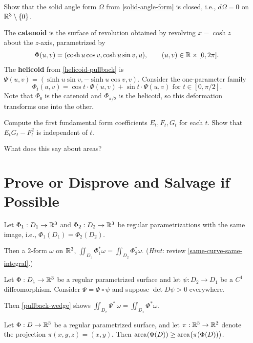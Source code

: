 \documentclass{homework}
\begin{document}
\begin{problem}\label{solid-angle-closed}%
  Show that the solid angle form $\Omega$ from \ref{solid-angle-form} is closed, i.e., $d\Omega=0$ on $\mathbb{R}^3\setminus\{0\}$.
  \end{problem}

\begin{problem}
  The \textbf{catenoid} is the surface of revolution obtained by revolving $x=\cosh z$ about the $z$-axis, parametrized by
  \[
    \Phi(u,v)=(\cosh u\cos v,\cosh u\sin v,u), \qquad (u,v)\in\mathbb{R}\times[0,2\pi].
  \]
  The \textbf{helicoid} from \ref{helicoid-pullback} is $\Psi(u,v)=(\sinh u \sin v,-\sinh u \cos v,v)$.
  Consider the one-parameter family
  \[
    \Phi_t(u,v)=\cos t \cdot \Phi(u,v) + \sin t \cdot \Psi(u,v)
    \text{ for $t\in[0,\pi/2]$.}
  \]
  Note that $\Phi_0$ is the catenoid and $\Phi_{\pi/2}$ is the helicoid, so this deformation transforms one into the other.

  Compute the first fundamental form coefficients $E_t,F_t,G_t$ for each $t$. Show that $E_t G_t - F_t^2$ is independent of $t$.
  
  What does this say about areas?
\end{problem}


\section{Prove or Disprove and Salvage if Possible}

\begin{problem}
  Let $\Phi_1:D_1\to\mathbb{R}^3$ and $\Phi_2:D_2\to\mathbb{R}^3$ be regular parametrizations with the same image, i.e., $\Phi_1(D_1)=\Phi_2(D_2)$.
  
  Then a $2$-form $\omega$ on $\mathbb{R}^3$,
  \(
  \displaystyle\iint_{D_1}\Phi_1^*\omega = \iint_{D_2}\Phi_2^*\omega.
  \) \hfill(\textit{Hint:} review \ref{same-curve-same-integral}.)
\end{problem}

\begin{problem}\label{reparametrization-invariance}%
  Let $\Phi:D_1\to\mathbb{R}^3$ be a regular parametrized surface and let $\psi:D_2\to D_1$ be a $C^1$ diffeomorphism.
  Consider $\Psi=\Phi\circ\psi$ and suppose $\det D\psi > 0$ everywhere.

  Then \ref{pullback-wedge} shows \(\displaystyle\iint_{D_2}\Psi^*\,\omega=\displaystyle\iint_{D_1}\Phi^*\omega\).
\end{problem}

\begin{problem}
  Let $\Phi:D\to\mathbb{R}^3$ be a regular parametrized surface, and let $\pi:\mathbb{R}^3\to\mathbb{R}^2$ denote the projection $\pi(x,y,z)=(x,y)$.
  Then \(\operatorname{area}(\Phi(D))\ge\operatorname{area}\bigl(\pi(\Phi(D))\bigr)\).
\end{problem}
\end{document}
